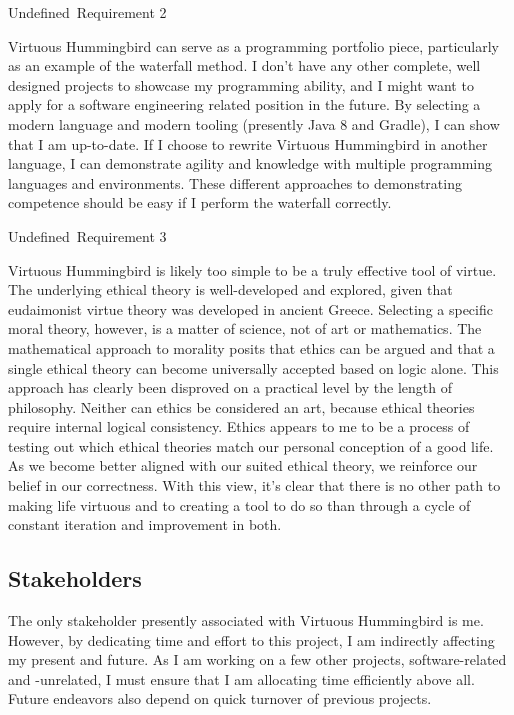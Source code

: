 \documentclass{article}
\newcommand{\requirementname}{Undefined}
\newcommand{\requirementlabel}{undefined}
\newenvironment{requirement}[2][]
    {
        \begin{mdframed}
        \label{\requirementlabel-#2}
        \vspace{2.5mm}
        \begin{center}
            {
                \large
                \requirementname\ Requirement #2
            
                #1
            }
        \end{center}
        \vspace{2.5mm}
    }
    {
        \end{mdframed}
    }
\begin{document}
\begin{requirement}{2}
    Virtuous Hummingbird can serve as a programming portfolio piece, particularly as an example of the waterfall method.
    I don't have any other complete, well designed projects to showcase my programming ability, and I might want to apply for a software engineering related position in the future.
    By selecting a modern language and modern tooling (presently Java 8 and Gradle), I can show that I am up-to-date.
    If I choose to rewrite Virtuous Hummingbird in another language, I can demonstrate agility and knowledge with multiple programming languages and environments.
    These different approaches to demonstrating competence should be easy if I perform the waterfall correctly.
\end{requirement}
 
\begin{requirement}{3}
    Virtuous Hummingbird is likely too simple to be a truly effective tool of virtue.
    The underlying ethical theory is well-developed and explored, given that eudaimonist virtue theory was developed in ancient Greece.
    Selecting a specific moral theory, however, is a matter of science, not of art or mathematics.
    The mathematical approach to morality posits that ethics can be argued and that a single ethical theory can become universally accepted based on logic alone.
    This approach has clearly been disproved on a practical level by the length of philosophy.
    Neither can ethics be considered an art, because ethical theories require internal logical consistency.
    Ethics appears to me to be a process of testing out which ethical theories match our personal conception of a good life.
    As we become better aligned with our suited ethical theory, we reinforce our belief in our correctness.
    With this view, it's clear that there is no other path to making life virtuous and to creating a tool to do so than through a cycle of constant iteration and improvement in both.
\end{requirement}

\subsection{Stakeholders}

The only stakeholder presently associated with Virtuous Hummingbird is me.
However, by dedicating time and effort to this project, I am indirectly affecting my present and future.
As I am working on a few other projects, software-related and -unrelated, I must ensure that I am allocating time efficiently above all.
Future endeavors also depend on quick turnover of previous projects.
\end{document}
